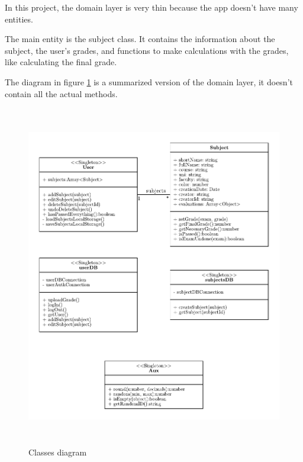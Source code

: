 



In this project, the domain layer is very thin because the app doesn't have many entities.

The main entity is the subject class. It contains the information about the subject, the user's grades, and functions to make calculations with the grades, like calculating the final grade.

The diagram in figure \ref{fig:class-diagram} is a summarized version of the domain layer, it doesn't contain all the actual methods.

\vfill
\begin{figure}[H]
    \center
    \includegraphics[height=15cm]{media/diagrams/class-diagram.pdf}
    \caption{Classes diagram}
    \label{fig:class-diagram}
\end{figure}
\vfill
